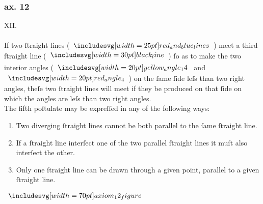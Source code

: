 \begin{minipage}{0.67\textwidth}
    \subsubsection{ax. 12}
    \begin{center}
        XII.\label{ax12}\\
        \hfill\\
        If two ſtraight lines (\hspace{-1ex}$\img{red_and_blue_lines}$\hspace{-1ex}) meet a third ſtraight line (\hspace{-1ex}$\blackline$\hspace{-1ex}) ſo as to make the two interior angles (\hspace{-1ex}$\img[0][0][20]{yellow_angle_14}$ and $\img[0][0][20]{red_angle_4}$\hspace{-1ex}) on the ſame ſide leſs than two right angles, theſe two ſtraight lines will meet if they be produced on that ſide on which the angles are leſs than two right angles.\\
        The fifth poſtulate may be expreſſed in any of the following ways:\\
        \begin{enumerate}
            \item Two diverging ſtraight lines cannot be both parallel to the ſame ſtraight line.
            \item If a ſtraight line interſect one of the two parallel ſtraight lines it muſt also interſect the other.
            \item Only one ſtraight line can be drawn through a given point, parallel to a given ſtraight line.
        \end{enumerate}
    \end{center}
\end{minipage}%
\begin{minipage}{0.33\textwidth}
    \begin{center}
        $\img[0][0][70]{axiom_12_figure}$
    \end{center}
\end{minipage}

\pagebreak

